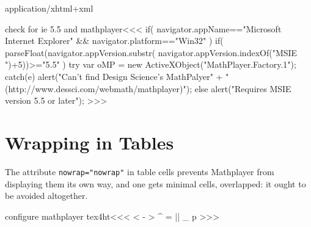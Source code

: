 application/xhtml+xml



\<check for ie 5.5 and mathplayer\><<<
if(   navigator.appName=="Microsoft Internet Explorer"   \Hnewline
   && navigator.platform=="Win32"                        \Hnewline
){                                                       \Hnewline
  if( parseFloat(navigator.appVersion.substr(            \Hnewline
       navigator.appVersion.indexOf("MSIE ")+5))>="5.5"  \Hnewline
  ){
    try {                                                  \Hnewline
      var oMP = new ActiveXObject("MathPlayer.Factory.1"); \Hnewline
    }                                                      \Hnewline
    catch(e) { alert("Can't find Design Science's MathPalyer" +  \Hnewline
          "(http://www.dessci.com/webmath/mathplayer)");} \Hnewline
  } else {                                                \Hnewline
    alert("Requires MSIE version 5.5 or later");          \Hnewline
} }                                                       \Hnewline
>>>

\section{Wrapping in Tables}

The attribute \verb+nowrap="nowrap"+ in table cells prevents
Mathplayer from displaying them its own way, and one gets minimal
cells, overlapped: it ought to be avoided altogether.

\<configure mathplayer tex4ht\><<<
 {}{}
   {<}{\ifmathml {}\else
        \fi}
   {-}{\ifmathml {}\else
        \fi}
   {>}{\ifmathml {}\else
        \fi}
   {^}{\ifmathml {}\else
        \fi}
   {=}{\ifmathml {}\else
        \fi}
   {||}{\ifmathml {}\else
        \fi}
   {_}{\ifmathml {}\else
        \fi}
   {p}{\ifmathml {}\else
        \fi}
   {}
>>>







